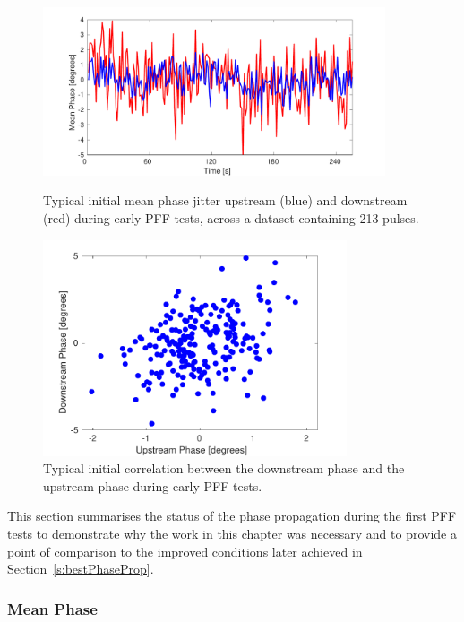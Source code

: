 \begin{figure}
  \centering
  \includegraphics[width=0.9\textwidth]{Figures/propagation/origMeanPhJit}
  \caption{Typical initial mean phase jitter upstream (blue) and downstream (red) during early PFF tests, across a dataset containing 213 pulses.}
   \label{f:origMeanPhJit}
  \includegraphics[width=0.8\textwidth]{Figures/propagation/origUpVsDown}
  \caption{Typical initial correlation between the downstream phase and the upstream phase during early PFF tests.}
  \label{f:origUpVsDown}
\end{figure}



This section summarises the status of the phase propagation during the first PFF tests to demonstrate why the work in this chapter was necessary and to provide a point of comparison to the improved conditions later achieved in Section~\ref{s:bestPhaseProp}.

\subsubsection{Mean Phase}



